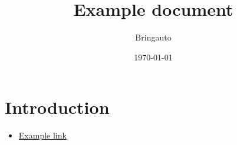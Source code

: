 \documentclass{article}
\title{Example document}
\author{Bringauto}
\date{\today}
\begin{document}
\maketitle %

\section{Introduction}

\begin{itemize}
    \item \href{\getref{example}}{Example link}
\end{itemize}
\end{document}
